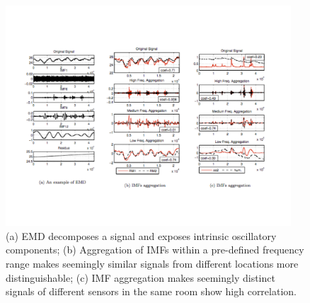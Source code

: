 \begin{figure}[ht!]
\centering
    \includegraphics[width=0.95\textwidth]{figs/IMFReAggExample}
\caption{(a) EMD decomposes a signal and exposes intrinsic oscillatory components; (b) Aggregation of IMFs within a pre-defined frequency range makes seemingly similar signals from different locations more distinguishable; (c) IMF aggregation makes seemingly distinct signals of different sensors in the same room show high correlation.}
\end{figure}



